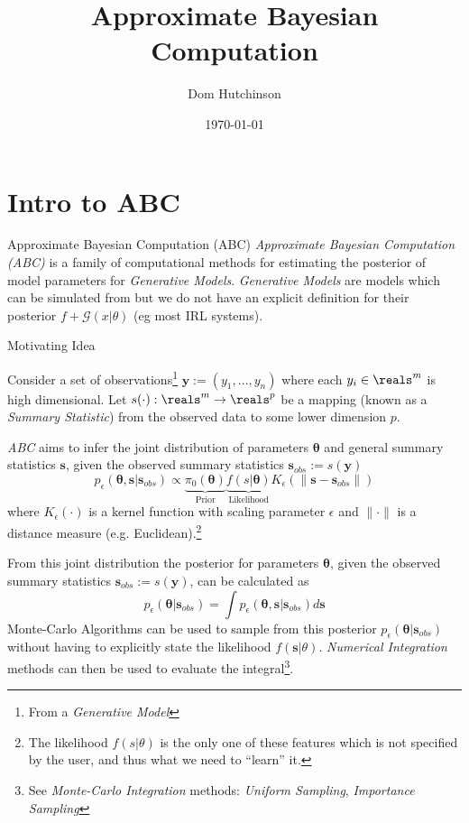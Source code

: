 \documentclass[11pt,a4paper]{article}
\begin{document}
\setcounter{section}{1}

\title{Approximate Bayesian Computation}
\author{Dom Hutchinson}
\date{\today}
\maketitle

\section*{Intro to ABC}

  \begin{definition}{Approximate Bayesian Computation (ABC)}
    \textit{Approximate Bayesian Computation (ABC)} is a family of computational methods for estimating the posterior of model parameters for \textit{Generative Models}. \textit{Generative Models} are models which can be simulated from but we do not have an explicit definition for their posterior $f+\mathcal{G}(x|\theta)$ (eg most IRL systems).
  \end{definition}

  \begin{proposition}{Motivating Idea\cite{ABC_Annual_Review}}
    \par Consider a set of observations\footnote{From a \textit{Generative Model}} $\mathbf{y}:=(y_1,\dots,y_n)$ where each $y_i\in\reals^m$ is high dimensional. Let $s(\cdot):\reals^m\to\reals^p$ be a mapping (known as a \textit{Summary Statistic}) from the observed data to some lower dimension $p$.
    \par \textit{ABC} aims to infer the joint distribution of parameters $\pmb\theta$ and general summary statistics $\mathbf{s}$, given the observed summary statistics $\mathbf{s}_{obs}:=s(\mathbf{y})$
    \[ p_\epsilon(\pmb\theta,\mathbf{s}|\mathbf{s}_{obs})\propto\underbrace{\pi_0(\pmb\theta)}_\text{Prior}\underbrace{f(s|\pmb\theta)}_\text{Likelihood}K_\epsilon(\|\mathbf{s}-\mathbf{s}_{obs}\|) \]
    where $K_\epsilon(\cdot)$ is a kernel function with scaling parameter $\epsilon$ and $\|\cdot\|$ is a distance measure (e.g. Euclidean).\footnote{The likelihood $f(s|\theta)$ is the only one of these features which is not specified by the user, and thus what we need to ``learn'' it.}
    \par From this joint distribution the posterior for parameters $\pmb\theta$, given the observed summary statistics $\mathbf{s}_{obs}:=s(\mathbf{y})$, can be calculated as
    \[ p_\epsilon(\pmb\theta|\mathbf{s}_{obs})=\int p_\epsilon(\pmb\theta,\mathbf{s}|\mathbf{s}_{obs})d\mathbf{s} \]
    Monte-Carlo Algorithms can be used to sample from this posterior $p_\epsilon(\pmb\theta|\mathbf{s}_{obs})$ without having to explicitly state the likelihood $f(\mathbf{s}|\theta)$. \textit{Numerical Integration} methods can then be used to evaluate the integral\footnote{See \textit{Monte-Carlo Integration} methods: \textit{Uniform Sampling}, \textit{Importance Sampling}}.
  \end{proposition}
\end{document}
